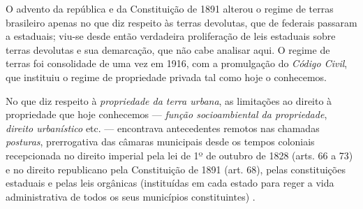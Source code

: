 O advento da república e da Constituição de 1891 alterou o regime de terras brasileiro apenas no que diz respeito às terras devolutas, que de federais passaram a estaduais; viu-se desde então verdadeira proliferação de leis estaduais sobre terras devolutas e sua demarcação, que não cabe analisar aqui. O regime de terras foi consolidade de uma vez em 1916, com a promulgação do \textit{Código Civil}, que instituiu o regime de propriedade privada tal como hoje o conhecemos. 

No que diz respeito à \textit{propriedade da terra urbana}, as limitações ao direito à propriedade que hoje conhecemos --- \textit{função socioambiental da propriedade}, \textit{direito urbanístico} etc. --- encontrava antecedentes remotos nas chamadas \textit{posturas}, prerrogativa das câmaras municipais desde os tempos coloniais recepcionada no direito imperial pela lei de 1º de outubro de 1828 (arts. 66 a 73) e no direito republicano pela Constituição de 1891 (art. 68), pelas constituições estaduais e pelas leis orgânicas (instituídas em cada estado para reger a vida administrativa de todos os seus municípios constituintes) \cite{campanhole_const_1992}.